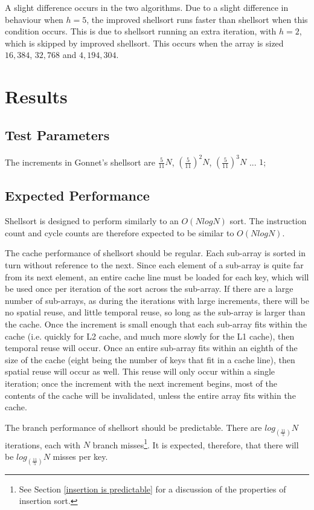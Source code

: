 A slight difference occurs in the two algorithms. Due to a slight difference
in behaviour when $h = 5$, the improved shellsort runs faster than shellsort
when this condition occurs. This is due to shellsort running an extra iteration,
with $h = 2$, which is skipped by improved shellsort. This occurs when the array
is sized $16,384$, $32,768$ and $4,194,304$. 



\section{Results}
\subsection{Test Parameters}
The increments in Gonnet's shellsort are $\frac{5}{11}N$, $(\frac{5}{11})^2N$,
$(\frac{5}{11})^3N$ ... $1$;

\subsection{Expected Performance}
Shellsort is designed to perform similarly to an $O(NlogN)$ sort. The instruction
count and cycle counts are therefore expected to be similar to $O(NlogN)$.

The cache performance of shellsort should be regular. Each sub-array is sorted in
turn without reference to the next. Since each element of a sub-array is quite
far from its next element, an entire cache line must be loaded for each key,
which will be used once per iteration of the sort across the sub-array. If there
are a large number of sub-arrays, as during the iterations with large increments,
there will be no spatial reuse, and little temporal reuse, so long as the
sub-array is larger than the cache. Once the increment is small enough that each
sub-array fits within the cache (i.e. quickly for L2 cache, and much more slowly
for the L1 cache), then temporal reuse will occur. Once an entire sub-array fits
within an eighth of the size of the cache (eight being the number of keys that
fit in a cache line), then spatial reuse will occur as well. This reuse will
only occur within a single iteration; once the increment with the next increment
begins, most of the contents of the cache will be invalidated, unless the entire
array fits within the cache.

The branch performance of shellsort should be predictable. There are
$log_{(\frac{11}{5})}N$ iterations, each with $N$ branch misses\footnote{See
Section \ref{insertion is predictable} for a discussion of the properties of
insertion sort.}. It is expected, therefore, that there will be
$log_{(\frac{11}{5})}N$ misses per key.

